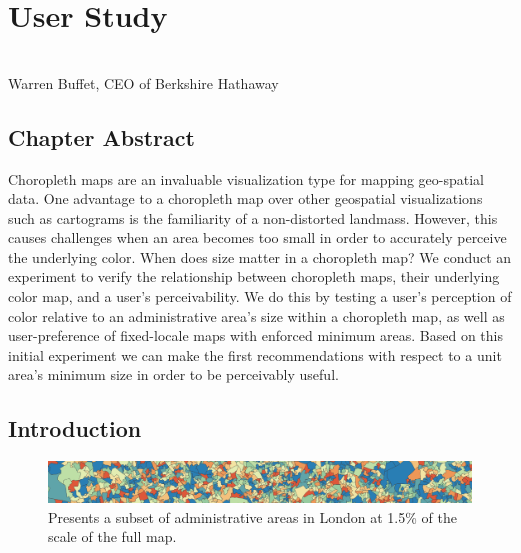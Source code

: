 \chapter{User Study}
\label{chap:userStudy}

 \cite{mcnabb2018dynamic}  \\

{Warren Buffet, CEO of Berkshire Hathaway}

\newpage
{\footnotesize \hypersetup{linkcolor=black}
\minitoc}

\newpage
{}
\vspace*{4cm}
\section*{Chapter Abstract}
Choropleth maps are an invaluable visualization type for mapping geo-spatial data. One advantage to a choropleth map over other geospatial visualizations such as cartograms is the familiarity of a non-distorted landmass. However, this causes challenges when an area becomes too small in order to accurately perceive the underlying color. When does size matter in a choropleth map? We conduct an experiment to verify the relationship between choropleth maps, their underlying color map, and a user's perceivability. We do this by testing a user's perception of color relative to an administrative area's size within a choropleth map, as well as user-preference of fixed-locale maps with enforced minimum areas. Based on this initial experiment we can make the first recommendations with respect to a unit area's minimum size in order to be perceivably useful.

\newpage

\section{Introduction} \label{sec:introduction}
 \begin{figure}[ht]
  \centering
  \includegraphics[width=\linewidth]{images/CypressView2}
  \caption{Presents a subset of administrative areas in London at 1.5\% of the scale of the full map.}
	\label{fig:teaser}
\end{figure}


